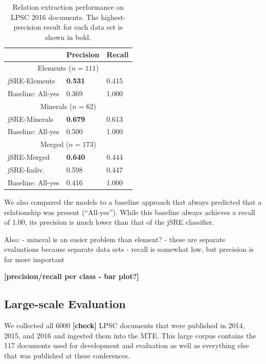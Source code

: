 \documentclass[letterpaper]{article} %
\begin{document}
\begin{table}
\caption{Relation extraction performance on LPSC 2016 documents. 
The highest-precision result for each data set is shown in bold.}
\label{tab:re}
\begin{center}
\begin{tabular}{l|ll}
 & Precision & Recall \\ \hline
\multicolumn{3}{c}{Elements ($n=111$)} \\
jSRE-Elements & {\bf 0.531} & 0.415 \\
Baseline: All-yes & 0.369 & 1.000 \\ \hline
\multicolumn{3}{c}{Minerals ($n=62$)} \\
jSRE-Minerals & {\bf 0.679} & 0.613 \\ 
Baseline: All-yes & 0.500 & 1.000 \\ \hline
\multicolumn{3}{c}{Merged ($n=173$)} \\
jSRE-Merged  & {\bf 0.640} & 0.444 \\
jSRE-Indiv.  & 0.598 & 0.447 \\
Baseline: All-yes & 0.416 & 1.000 \\ \hline
\end{tabular}
\end{center}
\end{table}

We also compared the models to a baseline approach that always
predicted that a relationship was present (``All-yes'').  While this
baseline always achieves a recall of 1.00, its precision is much lower
than that of the jSRE classifier.

Also:
- mineral is an easier problem than element?
- these are separate evaluations because separate data sets
- recall is somewhat low, but precision is far more important

{\bf [precision/recall per class - bar plot?] }

\subsection{Large-scale Evaluation}

We collected all 6000 {\bf [check]} LPSC documents that were published
in 2014, 2015, and 2016 and ingested them into the MTE.  This large
corpus contains the 117 documents used for development and evaluation
as well as everything else that was published at these conferences.
\end{document}
